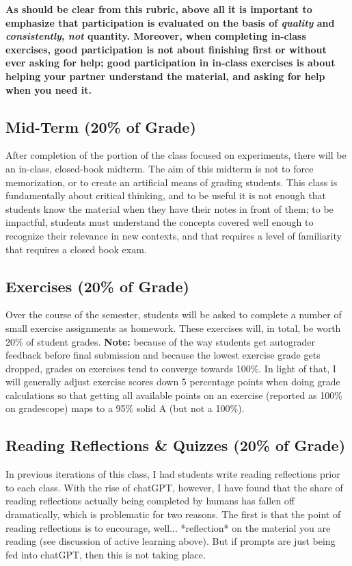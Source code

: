 \documentclass[12pt]{article}
\begin{document}
\textbf{As should be clear from this rubric, above all it is important to emphasize that participation is evaluated on the basis of \emph{quality} and \emph{consistently}, \emph{not} quantity. Moreover, when completing in-class exercises, good participation is not about finishing first or without ever asking for help; good participation in in-class exercises is about helping your partner understand the material, and asking for help when you need it.}

\subsection{Mid-Term (20\% of Grade)}

After completion of the portion of the class focused on experiments, there will be an in-class, closed-book midterm. The aim of this midterm is not to force memorization, or to create an artificial means of grading students. This class is fundamentally about critical thinking, and to be useful it is not enough that students know the material when they have their notes in front of them; to be impactful, students must understand the concepts covered well enough to recognize their relevance in new contexts, and that requires a level of familiarity that requires a closed book exam.

\subsection{Exercises (20\% of Grade)}

Over the course of the semester, students will be asked to complete a number of small exercise assignments as homework. These exercises will, in total, be worth 20\% of student grades.  \textbf{Note:} because of the way students get autograder feedback before final submission and because the lowest exercise grade gets dropped, grades on exercises tend to converge towards 100\%. In light of that, I will generally adjust exercise scores down 5 percentage points when doing grade calculations so that getting all available points on an exercise (reported as 100\% on gradescope) maps to a 95\% solid A (but not a 100\%).

\subsection{Reading Reflections \& Quizzes (20\% of Grade)}

In previous iterations of this class, I had students write reading reflections prior to each class. With the rise of chatGPT, however, I have found that the share of reading reflections actually being completed by humans has fallen off dramatically, which is problematic for two reasons. The first is that the point of reading reflections is to encourage, well... *reflection* on the material you are reading (see discussion of active learning above). But if prompts are just being fed into chatGPT, then this is not taking place.
\end{document}
